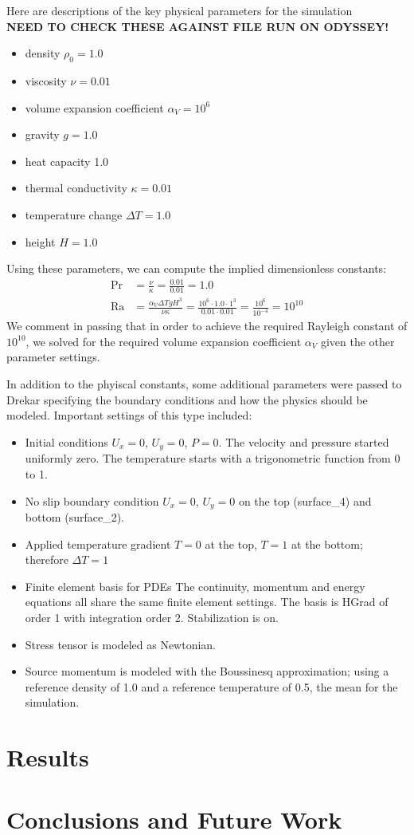 \documentclass[11pt]{article} %
\begin{document}
Here are descriptions of the key physical parameters for the simulation
\\ \textbf{NEED TO CHECK THESE AGAINST FILE RUN ON ODYSSEY!}
\begin{itemize}
\item{density} $\rho_0 = 1.0$
\item{viscosity} $\nu = 0.01$
\item{volume expansion coefficient} $\alpha_V = 10^6$
\item{gravity} $g = 1.0$
\item{heat capacity} 1.0
\item{thermal conductivity} $\kappa = 0.01$
\item{temperature change} $\Delta T = 1.0$ 
\item{height} $H = 1.0$
\end{itemize}

Using these parameters, we can compute the implied dimensionless constants:
\begin{align}
\textrm{Pr} &= \frac{\nu}{\kappa} = \frac{0.01}{0.01} = 1.0 \\
\textrm{Ra} &= \frac{\alpha_V \Delta T g H^3}{\nu \kappa} = \frac{10^{6} \cdot 1.0 \cdot 1^3}{0.01 \cdot 0.01} = \frac{10^{6}}{10^{-4}} = 10^{10}
\end{align}
We comment in passing that in order to achieve the required Rayleigh constant of $10^{10}$, 
we solved for the required volume expansion coefficient $\alpha_V$ given the other parameter settings.

In addition to the phyiscal constants, some additional parameters were passed to Drekar 
specifying the boundary conditions and how the physics should be modeled.
Important settings of this type included:
\begin{itemize}
\item{Initial conditions} $U_x = 0$, $U_y = 0$, $P = 0$.  The velocity and pressure started uniformly zero.
The temperature starts with a trigonometric function from 0 to 1.
\item{No slip boundary condition} $U_x = 0$, $U_y = 0$ 
on the top (surface\_4) and bottom (surface\_2).
\item{Applied temperature gradient} $T=0$ at the top, $T=1$ at the bottom; therefore $\Delta T = 1$
\item{Finite element basis for PDEs} The continuity, momentum and energy equations all share the same
finite element settings.  The basis is HGrad of order 1 with integration order 2.  Stabilization is on.
\item{Stress tensor} is modeled as Newtonian.
\item{Source momentum} is modeled with the Boussinesq approximation; 
using a reference density of 1.0 and a reference temperature of 0.5, the mean for the simulation.
\end{itemize}

\section{Results}

\section{Conclusions and Future Work}
\end{document}
